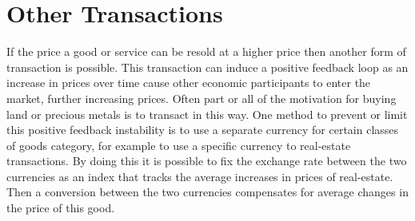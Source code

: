 \section{Other Transactions}
\label{section:other_transactions}

If the price a good or service can be resold at a higher price then another form of transaction is
possible. This transaction can induce a positive feedback loop as an increase in prices over time
cause other economic participants to enter the market, further increasing prices. Often part or all
of the motivation for buying land or precious metals is to transact in this way. One method to
prevent or limit this positive feedback instability is to use a separate currency for certain
classes of goods category, for example to use a specific currency to real-estate transactions. By
doing this it is possible to fix the exchange rate between the two currencies as an index that
tracks the average increases in prices of real-estate. Then a conversion between the two currencies
compensates for average changes in the price of this good.

